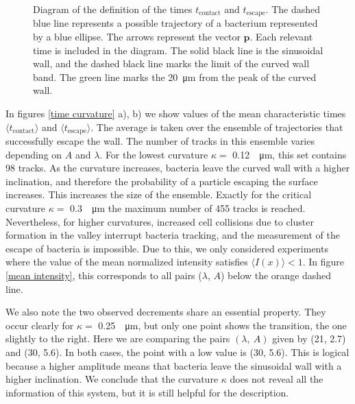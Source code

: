 \begin{figure}[H]
	\centering
	
	\caption[Diagram of the definition of the contact and escape times]{Diagram of the definition of the times $t_{\text{contact}}$ and $t_{\text{escape}}$. The dashed blue line represents a possible trajectory of a bacterium represented by a blue ellipse. The arrows represent the vector $\textbf{p}$. Each relevant time is included in the diagram. The solid black line is the sinusoidal wall, and the dashed black line marks the limit of the curved wall band. The green line marks the \SI{20}{\micro\meter} from the peak of the curved wall. }	
	\label{diagram characteristic times}
\end{figure}

In figures \ref{time curvature} a), b) we show values of the mean characteristic times $\langle t_{\text{contact}} \rangle$ and $\langle t_{\text{escape}} \rangle$. The average is taken over the ensemble of trajectories that successfully escape the wall. The number of tracks in this ensemble varies depending on $A$ and $\lambda$. For the lowest curvature $\kappa=$ \SI{0.12}{\per\micro\meter}, this set contains 98 tracks. As the curvature increases, bacteria leave the curved wall with a higher inclination, and therefore the probability of a particle escaping the surface increases. This increases the size of the ensemble. Exactly for the critical curvature $\kappa=$ \SI{0.3}{\per\micro\meter} the maximum number of 455 tracks is reached. Nevertheless, for higher curvatures, increased cell collisions due to cluster formation in the valley interrupt bacteria tracking, and the measurement of the escape of bacteria is impossible. Due to this, we only considered experiments where the value of the mean normalized intensity satisfies $\langle I(x) \rangle<1$. In figure \ref{mean intensity}, this corresponds to all pairs ($\lambda$, $A$) below the orange dashed line.  


We also note the two observed decrements share an essential property. They occur clearly for $\kappa=$ \SI{0.25}{\per\micro\meter}, but only one point shows the transition, the one slightly to the right. Here we are comparing the pairs $(\lambda, \ A)$ given by (21, 2.7) and (30, 5.6). In both cases, the point with a low value is  (30, 5.6). This is logical because a higher amplitude means that bacteria leave the sinusoidal wall with a higher inclination. We conclude that the curvature $\kappa$ does not reveal all the information of this system, but it is still helpful for the description.

